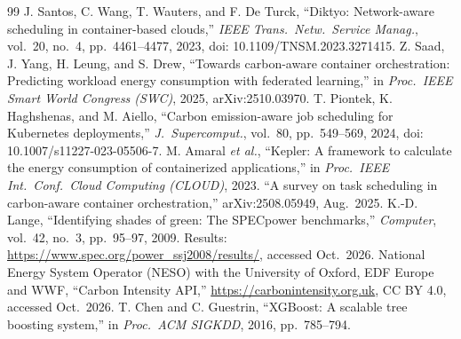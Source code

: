 \documentclass[conference]{IEEEtran}
\begin{document}
\begin{thebibliography}{99}
 J. Santos, C. Wang, T. Wauters, and F. De Turck, ``Diktyo: Network-aware scheduling in container-based clouds,'' \emph{IEEE Trans.\ Netw.\ Service Manag.}, vol.~20, no.~4, pp.~4461--4477, 2023, doi: 10.1109/TNSM.2023.3271415.
 Z. Saad, J. Yang, H. Leung, and S. Drew, ``Towards carbon-aware container orchestration: Predicting workload energy consumption with federated learning,'' in \emph{Proc.\ IEEE Smart World Congress (SWC)}, 2025, arXiv:2510.03970.
 T. Piontek, K. Haghshenas, and M. Aiello, ``Carbon emission-aware job scheduling for Kubernetes deployments,'' \emph{J.\ Supercomput.}, vol.~80, pp.~549--569, 2024, doi: 10.1007/s11227-023-05506-7.
 M. Amaral \emph{et al.}, ``Kepler: A framework to calculate the energy consumption of containerized applications,'' in \emph{Proc.\ IEEE Int.\ Conf.\ Cloud Computing (CLOUD)}, 2023.
 ``A survey on task scheduling in carbon-aware container orchestration,'' arXiv:2508.05949, Aug.\ 2025.
 K.-D. Lange, ``Identifying shades of green: The SPECpower benchmarks,'' \emph{Computer}, vol.~42, no.~3, pp.~95--97, 2009. Results: \url{https://www.spec.org/power_ssj2008/results/}, accessed Oct.\ 2026.
 National Energy System Operator (NESO) with the University of Oxford, EDF Europe and WWF, ``Carbon Intensity API,'' \url{https://carbonintensity.org.uk}, CC BY 4.0, accessed Oct.\ 2026.
 T. Chen and C. Guestrin, ``XGBoost: A scalable tree boosting system,'' in \emph{Proc.\ ACM SIGKDD}, 2016, pp.~785--794.
\end{thebibliography}
\end{document}
